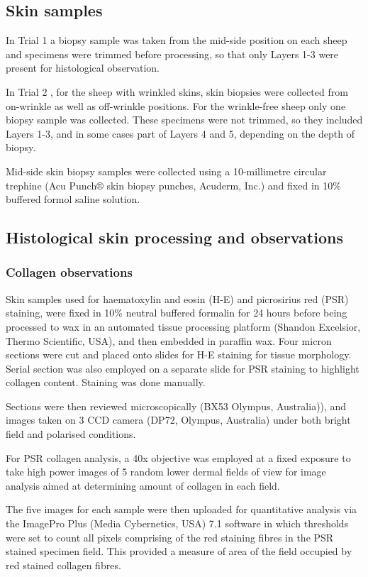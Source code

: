 \documentclass[]{interact}
\theoremstyle{plain}%
\theoremstyle{definition}
\theoremstyle{remark}
\begin{document}
\subsection{Skin samples}
In Trial 1 a biopsy sample was taken from the mid-side position on each sheep and specimens were trimmed \citep{maddocks-1988} before processing, so that only Layers 1-3  were present for histological observation.


In Trial 2 , for the sheep with wrinkled skins, skin biopsies were collected from on-wrinkle as well as off-wrinkle positions. For the wrinkle-free sheep only one biopsy sample was collected. These specimens were not trimmed, so they included Layers 1-3,  and in some cases part of Layers 4 and 5, depending on the depth of biopsy.

Mid-side skin biopsy samples were collected using a 10-millimetre
circular trephine (Acu Punch® skin biopsy punches, Acuderm, Inc.) and
fixed in 10\% buffered formol saline solution. 

\subsection{Histological skin processing and observations}
\subsubsection{Collagen observations}

Skin samples used for haematoxylin and eosin (H-E) and picrosirius red (PSR) staining, were fixed in 10\% neutral buffered formalin for 24 hours before being processed to wax in an automated tissue processing platform (Shandon Excelsior, Thermo Scientific, USA), and then embedded in paraffin wax. Four micron sections were cut and placed onto slides for H-E staining for tissue morphology. Serial section was also employed on a separate slide for PSR staining to highlight
collagen content. Staining was done manually.

Sections were then reviewed microscopically (BX53 Olympus, Australia)), and images taken on 3 CCD camera (DP72, Olympus, Australia) under both bright field and polarised conditions.

For PSR collagen analysis, a 40x objective was employed at a fixed exposure to take high power images of 5 random lower dermal fields of view for image analysis aimed at determining amount of collagen in each field. 

The five images for each sample were then uploaded for quantitative analysis via the ImagePro Plus (Media Cybernetics, USA) 7.1 software in which thresholds were set to count all pixels comprising of the red staining fibres in the PSR stained specimen field.  This provided a measure of area of the field occupied by red stained collagen fibres.
\end{document}
